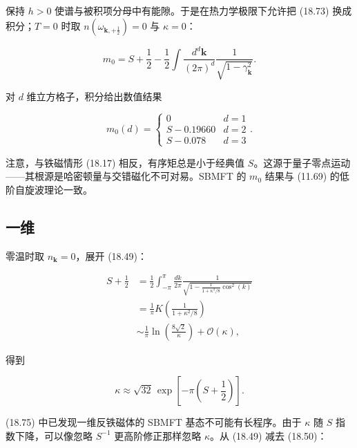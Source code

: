 保持 $h > 0$ 使谱与被积项分母中有能隙。于是在热力学极限下允许把 (18.73) 换成积分；$T = 0$ 时取 $n(\omega_{\mathbf{k}, + \frac{1}{2}}) = 0$ 与 $\kappa = 0$：

\begin{equation*}
m _ {0} = S + \frac {1}{2} - \frac {1}{2} \int \frac {d ^ {d} \mathbf {k}}{( 2 \pi ) ^ {d}} \frac {1}{\sqrt {1 - \gamma_{\mathbf {k}} ^ {2}}}.
\tag{18.74}
\end{equation*}

对 $d$ 维立方格子，积分给出数值结果

\begin{equation*}
m _ {0} ( d ) = \left\{ \begin{array}{ll} 0 & d = 1 \\ S - 0.19660 & d = 2 \\ S - 0.078 & d = 3 \end{array} \right..
\tag{18.75}
\end{equation*}

注意，与铁磁情形 (18.17) 相反，有序矩总是小于经典值 $S$。这源于量子零点运动——其根源是哈密顿量与交错磁化不可对易。SBMFT 的 $m_{0}$ 结果与 (11.69) 的低阶自旋波理论一致。

\subsection{一维}

零温时取 $n_{\mathbf{k}} = 0$，展开 (18.49)：

\begin{align*}
S + \frac {1}{2} & = \frac {1}{2} \int_{- \pi} ^ {\pi} \frac {d k}{2 \pi} \frac {1}{\sqrt {1 - \frac {1}{1 + \kappa^ {2} /8} \cos^ {2} ( k ) }}\\
& = \frac {1}{\pi} K \left( \frac {1}{1 + \kappa^ {2} /8} \right)\\
& \sim \frac {1}{\pi} \ln \left( \frac {8 \sqrt {2}}{\kappa} \right) + \mathcal {O} ( \kappa ) ,
\tag{18.76}
\end{align*}

得到

\begin{equation*}
\kappa \approx \sqrt {32} \, \exp \left[ - \pi \left( S + \frac {1}{2} \right) \right].
\tag{18.77}
\end{equation*}

(18.75) 中已发现一维反铁磁体的 SBMFT 基态不可能有长程序。由于 $\kappa$ 随 $S$ 指数下降，可以像忽略 $S^{-1}$ 更高阶修正那样忽略 $\kappa$。从 (18.49) 减去 (18.50)：

